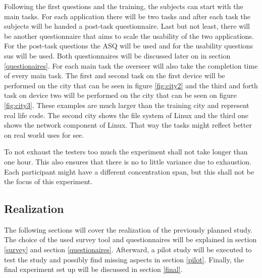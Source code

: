 Following the first questions and the training, the subjects can start with the main tasks.
For each application there will be two tasks and after each task the subjects will be handed a \gls{post-task} questionnaire.
Last but not least, there will be another questionnaire that aims to scale the \gls{usability} of the two applications.
For the \gls{post-task} questions the \gls{ASQ} will be used and for the \gls{usability} questions \gls{sus} will be used.
Both questionnaires will be discussed later on in section \ref{questionaires}.
For each main task the overseer will also take the completion time of every main task.
The first and second task on the first device will be performed on the \gls{city} that can be seen in figure \ref{fig:city2} and the third and forth task on device two will be performed on the \gls{city} that can be seen on figure \ref{fig:city3}.
These examples are much larger than the training \gls{city} and represent real life code.
The second \gls{city} shows the file system of Linux and the third one shows the network component of Linux.
That way the tasks might reflect better on real world uses for \gls{see}.

To not exhaust the testers too much the experiment shall not take longer than one hour.
This also ensures that there is no to little variance due to exhaustion.
Each participant might have a different concentration span, but this shall not be the focus of this experiment.

\subsection{Realization}
\label{real}
The following sections will cover the realization of the previously planned study. 
The choice of the used survey tool and questionnaires will be explained in section \ref{survey} and section \ref{questionaires}.
Afterward, a pilot study will be executed to test the study and possibly find missing aspects in section \ref{pilot}.
Finally, the final experiment set up will be discussed in section \ref{final}.

